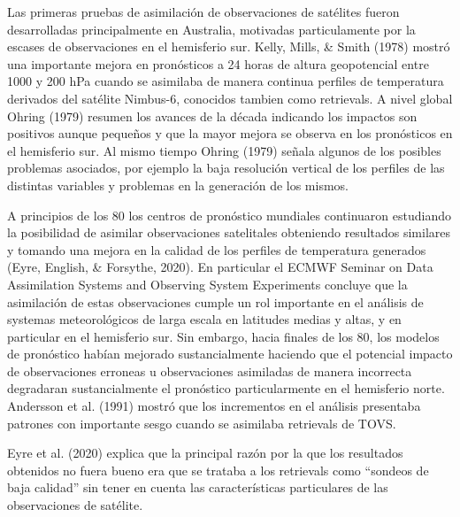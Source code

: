\documentclass[12pt,twoside]{reedthesis}
\begin{document}
Las primeras pruebas de asimilación de observaciones de satélites fueron desarrolladas principalmente en Australia, motivadas particulamente por la escases de observaciones en el hemisferio sur. Kelly, Mills, \& Smith (1978) mostró una importante mejora en pronósticos a 24 horas de altura geopotencial entre 1000 y 200 hPa cuando se asimilaba de manera continua perfiles de temperatura derivados del satélite Nimbus-6, conocidos tambien como retrievals. A nivel global Ohring (1979) resumen los avances de la década indicando los impactos son positivos aunque pequeños y que la mayor mejora se observa en los pronósticos en el hemisferio sur. Al mismo tiempo Ohring (1979) señala algunos de los posibles problemas asociados, por ejemplo la baja resolución vertical de los perfiles de las distintas variables y problemas en la generación de los mismos.

A principios de los 80 los centros de pronóstico mundiales continuaron estudiando la posibilidad de asimilar observaciones satelitales obteniendo resultados similares y tomando una mejora en la calidad de los perfiles de temperatura generados (Eyre, English, \& Forsythe, 2020). En particular el ECMWF Seminar on Data Assimilation Systems and Observing System Experiments concluye que la asimilación de estas observaciones cumple un rol importante en el análisis de systemas meteorológicos de larga escala en latitudes medias y altas, y en particular en el hemisferio sur. Sin embargo, hacia finales de los 80, los modelos de pronóstico habían mejorado sustancialmente haciendo que el potencial impacto de observaciones erroneas u observaciones asimiladas de manera incorrecta degradaran sustancialmente el pronóstico particularmente en el hemisferio norte. Andersson et al. (1991) mostró que los incrementos en el análisis presentaba patrones con importante sesgo cuando se asimilaba retrievals de TOVS.

Eyre et al. (2020) explica que la principal razón por la que los resultados obtenidos no fuera bueno era que se trataba a los retrievals como ``sondeos de baja calidad'' sin tener en cuenta las características particulares de las observaciones de satélite.
\end{document}
